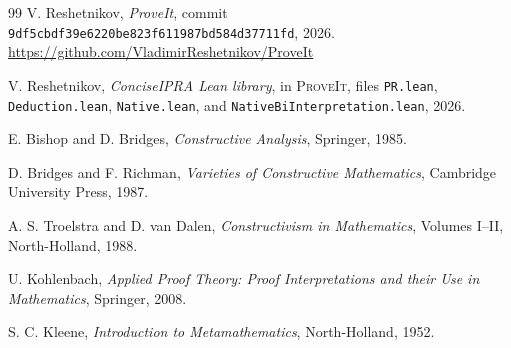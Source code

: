 \documentclass[11pt]{article}
\theoremstyle{definition}
\theoremstyle{remark}
\newcommand{\code}[1]{\texttt{#1}}
\newcommand{\repo}{\textsc{ProveIt}}
\begin{document}
\tableofcontents
\newpage














\begin{thebibliography}{99}
V. Reshetnikov, \emph{ProveIt}, commit
\code{9df5cbdf39e6220be823f611987bd584d37711fd}, 2026.
\url{https://github.com/VladimirReshetnikov/ProveIt}

V. Reshetnikov, \emph{ConciseIPRA Lean library}, in \repo{}, files
\code{PR.lean}, \code{Deduction.lean}, \code{Native.lean}, and
\code{NativeBiInterpretation.lean}, 2026.

E. Bishop and D. Bridges, \emph{Constructive Analysis}, Springer, 1985.

D. Bridges and F. Richman, \emph{Varieties of Constructive Mathematics}, Cambridge University Press, 1987.

A. S. Troelstra and D. van Dalen, \emph{Constructivism in Mathematics}, Volumes I--II, North-Holland, 1988.

U. Kohlenbach, \emph{Applied Proof Theory: Proof Interpretations and their Use in Mathematics}, Springer, 2008.

S. C. Kleene, \emph{Introduction to Metamathematics}, North-Holland, 1952.
\end{thebibliography}
\end{document}
